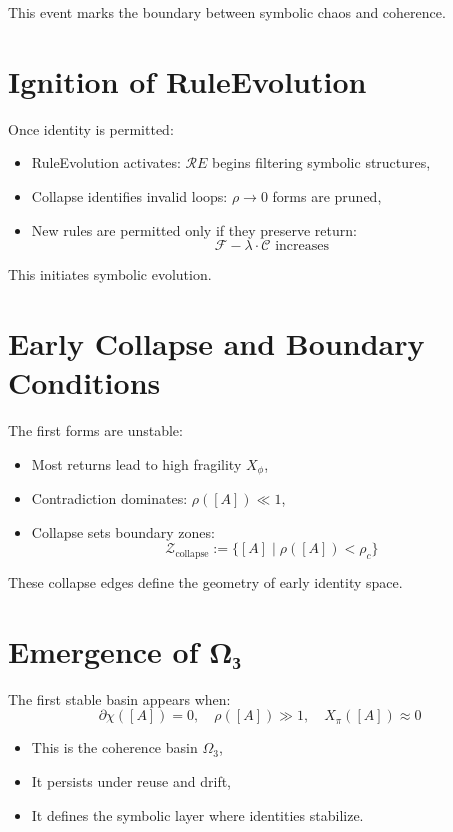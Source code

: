 This event marks the boundary between symbolic chaos and coherence.

\section{Ignition of RuleEvolution} \label{sec:re-ignition}

Once identity is permitted:
\begin{itemize}
  \item RuleEvolution activates: $\mathcal{R}E$ begins filtering symbolic structures,
  \item Collapse identifies invalid loops: $\rho \to 0$ forms are pruned,
  \item New rules are permitted only if they preserve return:
  \[
  \mathcal{F} - \lambda \cdot \mathcal{C} \text{ increases}
  \]
\end{itemize}

This initiates symbolic evolution.

\section{Early Collapse and Boundary Conditions} \label{sec:collapse-early}

The first forms are unstable:
\begin{itemize}
  \item Most returns lead to high fragility $X_\phi$,
  \item Contradiction dominates: $\rho([A]) \ll 1$,
  \item Collapse sets boundary zones:
  \[
  \mathcal{Z}_{\text{collapse}} := \{ [A] \mid \rho([A]) < \rho_c \}
  \]
\end{itemize}

These collapse edges define the geometry of early identity space.

\section{Emergence of Ω₃} \label{sec:omega3-emergence}

The first stable basin appears when:
\[
\partial\chi([A]) = 0,\quad \rho([A]) \gg 1,\quad X_\pi([A]) \approx 0
\]

\begin{itemize}
  \item This is the coherence basin $\Omega_3$,
  \item It persists under reuse and drift,
  \item It defines the symbolic layer where identities stabilize.
\end{itemize}

